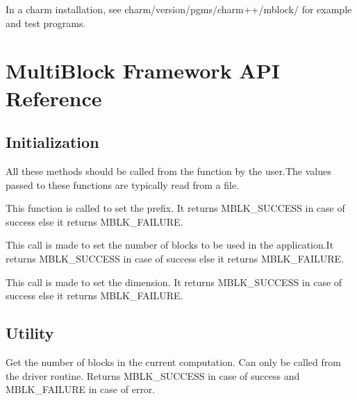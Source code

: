 \documentclass[10pt]{article}
\begin{document}
In a charm installation, see charm/version/pgms/charm++/mblock/
for example and test programs.


\section{MultiBlock Framework API Reference}

\subsection{Initialization}
All these methods should be called from the  function by the user.The values
passed to these functions are typically read from a file.

This function is called to set the prefix. It returns MBLK\_SUCCESS in case of 
success else it returns MBLK\_FAILURE.

\vspace{0.2in}

This call is made to set the number of blocks to be used in the application.It 
returns MBLK\_SUCCESS in case of success else it returns MBLK\_FAILURE.
\vspace{0.2in}

This call is made to set the dimension. It returns MBLK\_SUCCESS in case of 
success else it returns MBLK\_FAILURE.

\subsection{Utility}

     Get the number of blocks in the current computation.  Can
     only be called from the driver routine. Returns MBLK\_SUCCESS in case of
     success and MBLK\_FAILURE in case of error.
\vspace{0.2in}

\end{document}
